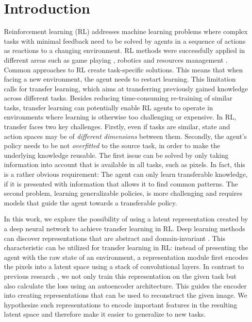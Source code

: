 \section{Introduction}
\label{sec:introduction}

Reinforcement learning (RL) addresses machine learning problems where complex tasks with minimal feedback \citep{taylor2007cross} need to be solved by agents in a sequence of actions as reactions to a changing environment. RL methods were successfully applied in different areas such as game playing \citep{silver2016mastering}, robotics \citep{levine2016end} and resources management \citep{mao2016resource}. 
Common approaches to RL create task-specific solutions. This means that when facing a new environment, the agent needs to restart learning. This limitation calls for transfer learning, which aims at transferring previously gained knowledge across different tasks. Besides reducing time-consuming re-training of similar tasks, transfer learning can potentially enable RL agents to operate in environments where learning is otherwise too challenging \citep{barreto2018transfer} or expensive. In RL, transfer faces two key challenges. Firstly, even if tasks are similar, state and action spaces may be of \textit{different dimensions} between them. Secondly, the agent's policy needs to be not \textit{overfitted} to the source task, in order to make the underlying knowledge reusable. %
The first issue can be solved by only taking information into account that is available in all tasks, such as pixels. In fact, this is a rather obvious requirement: The agent can only learn transferable knowledge, if it is presented with information that allows it to find common patterns. The second problem, learning generalizable policies, is more challenging and requires models that guide the agent towards a transferable policy. 

In this work, we explore the possibility of using a latent representation created by a deep neural network to achieve transfer learning in RL. Deep learning methods can discover representations that are abstract and domain-invariant \citep{bengio2012deep, ganin2014unsupervised}. This characteristic can be utilized for transfer learning in RL: instead of presenting the agent with the raw state of an environment, a representation module first encodes the pixels into a latent space using a stack of convolutional layers. In contrast to previous research \citep[see e.g.][]{DQN, DuelingDQN}, we not only train this representation on the given task but also calculate the loss using an autoencoder architecture. This guides the encoder into creating representations that can be used to reconstruct the given image. We hypothesize such representations to encode important features in the resulting latent space and therefore make it easier to generalize to new tasks.

